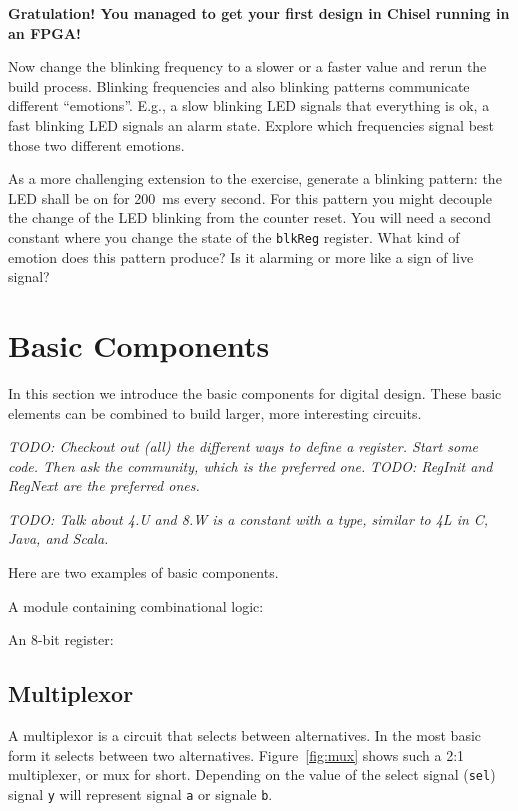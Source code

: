 \documentclass[a4paper]{article}
\newcommand{\code}[1]{{\small{\texttt{#1}}}}
\newcommand{\todo}[1]{{\emph{TODO: #1}}}
\begin{document}
{\bf Gratulation! You managed to get your first design in Chisel running in an FPGA!}

Now change the blinking frequency to a slower or a faster value and
rerun the build process. Blinking frequencies and also blinking patterns
communicate different ``emotions''. E.g., a slow blinking LED signals that
everything is ok, a fast blinking LED signals an alarm state.
Explore which frequencies signal best those two different emotions.

As a more challenging extension to the exercise, generate a blinking pattern:
the LED shall be on for 200~ms every second. For this pattern you might
decouple the change of the LED blinking from the counter reset.
You will need a second constant where you change the state of the
\code{blkReg} register. What kind of emotion does this pattern produce?
Is it alarming or more like a sign of live signal?




\section{Basic Components}

In this section we introduce the basic components for digital design.
These basic elements can be combined to build larger, more interesting
circuits.

\todo{Checkout out (all) the different ways to define a register.
Start some code.
Then ask the community, which is the preferred one.}
\todo{RegInit and RegNext are the preferred ones.}



\todo{Talk about 4.U and 8.W is a constant with a type, similar to 4L in C, Java, and Scala.}

Here are two examples of basic components.

A module containing combinational logic:



An 8-bit register:



\subsection{Multiplexor}

A multiplexor is a circuit that selects between alternatives. In the most
basic form it selects between two alternatives. Figure~\ref{fig:mux} shows
such a 2:1 multiplexer, or mux for short. Depending on the value of the
select signal (\code{sel}) signal \code{y} will represent signal \code{a} or
signale \code{b}.
\end{document}
